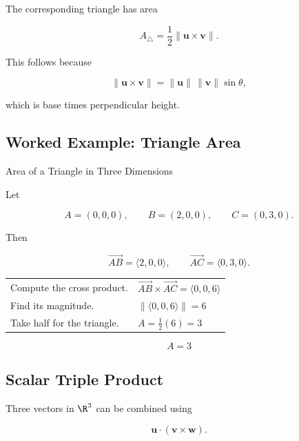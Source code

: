 The corresponding triangle has area

\[
\boxed{
A_{\triangle}
=
\frac12\|\mathbf{u}\times\mathbf{v}\|.
}
\]

This follows because

\[ \|\mathbf{u}\times\mathbf{v}\|
=\|\mathbf{u}\|\,\|\mathbf{v}\|\sin\theta, \]

which is base times perpendicular height.

\subsection{Worked Example: Triangle Area}
\label{subsec:worked-cross-product-area}

\begin{workedexamplebox}{Area of a Triangle in Three Dimensions}

Let

\[
A=(0,0,0),\qquad
B=(2,0,0),\qquad
C=(0,3,0).
\]

Then

\[ \overrightarrow{AB}=\langle2,0,0\rangle,\qquad
\overrightarrow{AC}=\langle0,3,0\rangle. \]

\begin{tabularx}{\textwidth}{@{}>{\raggedright\arraybackslash}p{}X@{}}
Compute the cross product. &
\(\overrightarrow{AB}\times\overrightarrow{AC}
=\langle0,0,6\rangle\)\\
Find its magnitude. &
\(\|\langle0,0,6\rangle\|=6\)\\
Take half for the triangle. &
\(A=\frac12(6)=3\)
\end{tabularx}

\begin{answerbox}
\[ \boxed{A=3} \]
\end{answerbox}
\end{workedexamplebox}

\subsection{Scalar Triple Product}
\label{subsec:scalar-triple-product}

Three vectors in \(\R^3\) can be combined using

\[ \boxed{\mathbf{u}\cdot(\mathbf{v}\times\mathbf{w}).} \]


